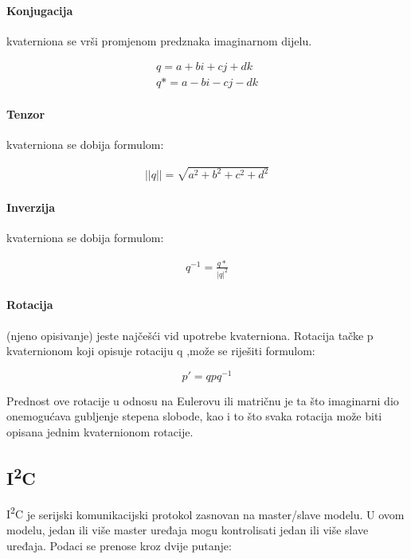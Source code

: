 \documentclass[../Document.tex]{subfiles}
\begin{document}

\paragraph{Konjugacija}
kvaterniona se vrši promjenom predznaka imaginarnom dijelu.

\begin{align*}
    q=a + bi + cj + dk \\
    q*=a - bi - cj - dk
\end{align*}

\paragraph{Tenzor}
kvaterniona se dobija formulom:

\begin{align*}
    ||q||=\sqrt{a^2 + b^2 + c^2 + d^2}
\end{align*}

\paragraph{Inverzija}
kvaterniona se dobija formulom:

\begin{align*}
    q^{-1}=\frac{q*}{|q|^2}
\end{align*}

\paragraph{Rotacija} (njeno opisivanje) jeste najčešći vid upotrebe kvaterniona. Rotacija tačke p kvaternionom koji opisuje rotaciju q ,može se riješiti formulom:

$$p'=qpq^{-1}$$

\noindent Prednost ove rotacije u odnosu na Eulerovu ili matričnu je ta što imaginarni dio onemogućava gubljenje stepena slobode, kao i to što svaka rotacija može biti opisana jednim kvaternionom rotacije.

\newcommand{\itc}{I\textsuperscript{2}C}\label{itc}
\subsection{\itc}
{\itc} je serijski komunikacijski protokol zasnovan na master/slave modelu. U ovom modelu, jedan ili više master uređaja mogu kontrolisati jedan ili više slave uređaja. Podaci se prenose kroz dvije putanje:
\end{document}
